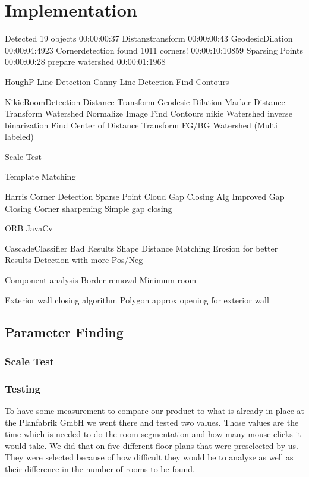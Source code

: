 \section{Implementation}
Detected 19 objects
00:00:00:37
Distanztransform
00:00:00:43
GeodesicDilation
00:00:04:4923
Cornerdetection
found 1011 corners!
00:00:10:10859
Sparsing Points
00:00:00:28
prepare watershed
00:00:01:1968

HoughP Line Detection
Canny Line Detection
Find Contours

NikieRoomDetection
Distance Transform
Geodesic Dilation
Marker Distance Transform
Watershed
Normalize Image
Find Contours nikie
Watershed inverse binarization
Find Center of Distance Transform
FG/BG Watershed (Multi labeled)

Scale Test

Template Matching

Harris Corner Detection
Sparse Point Cloud
Gap Closing Alg
Improved Gap Closing
Corner sharpening
Simple gap closing

ORB
JavaCv

CascadeClassifier
Bad Results
Shape Distance Matching
Erosion for better Results
Detection with more Pos/Neg

Component analysis
Border removal
Minimum room

Exterior wall closing algorithm
Polygon approx
opening for exterior wall





\subsection{Parameter Finding}
\label{subsec:Parameter Finding}
\subsubsection{Scale Test}
\subsubsection{Testing}
To have some measurement to compare our product to what is already in place at the Planfabrik GmbH we went there and tested two values. Those values are the time which is needed to do the room segmentation and how many mouse-clicks it would take. We did that on five different floor plans that were preselected by us. They were selected because of how difficult they would be to analyze as well as their difference in the number of rooms to be found.

